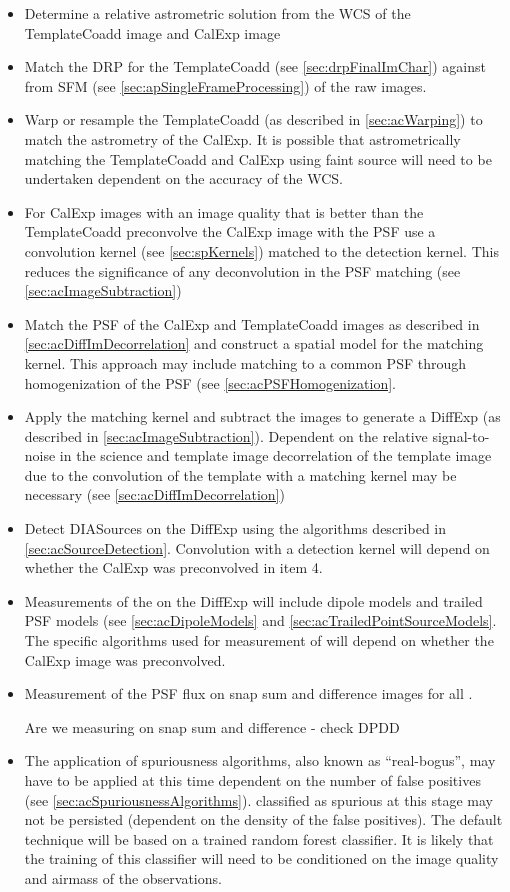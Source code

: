 \begin{itemize}
\item Determine a relative astrometric solution from the WCS of the TemplateCoadd image and CalExp image
\item Match the DRP \Sources for the TemplateCoadd (see \ref{sec:drpFinalImChar}) against \Sources from SFM (see \ref{sec:apSingleFrameProcessing}) of the raw images.
\item Warp or resample the TemplateCoadd (as described in \ref{sec:acWarping}) to match the astrometry of the CalExp. It is possible that astrometrically matching the TemplateCoadd and CalExp using faint source will need to be undertaken dependent on the accuracy of the WCS.
\item For CalExp images with an image quality that is better than the TemplateCoadd preconvolve the CalExp image with the PSF use a  convolution kernel (see \ref{sec:spKernels}) matched to the detection kernel. This reduces the significance of any deconvolution in the PSF matching (see \ref{sec:acImageSubtraction})
\item Match the PSF of the CalExp and TemplateCoadd images as described in \ref{sec:acDiffImDecorrelation} and construct a spatial model for the matching kernel. This approach may include matching to a common PSF through homogenization of the PSF (see \ref{sec:acPSFHomogenization}.
\item Apply the matching kernel and subtract the images to generate a DiffExp (as described in \ref{sec:acImageSubtraction}). Dependent on the relative signal-to-noise in the science and template image decorrelation of the template image due to the convolution of the template with a matching kernel may be necessary (see \ref{sec:acDiffImDecorrelation})
\item Detect DIASources on the DiffExp using the algorithms described in \ref{sec:acSourceDetection}. Convolution with a detection kernel will depend on whether the CalExp was preconvolved in item 4. 
\item Measurements of the \DIASources on the DiffExp will include dipole models and trailed PSF models (see  \ref{sec:acDipoleModels} and \ref{sec:acTrailedPointSourceModels}. The specific algorithms used for measurement of \DIASources will depend on whether the CalExp image was preconvolved.  
\item Measurement of the PSF flux on snap sum and difference images for all \DIASources.
\begin{note} Are we measuring on snap sum and difference - check DPDD\end{note}
\item The application of spuriousness algorithms, also known as ``real-bogus'', may have to be applied at this time dependent on the number of false positives (see \ref{sec:acSpuriousnessAlgorithms}). \DIASources classified as spurious at this stage may not be persisted (dependent on the density of the false positives). The default technique will be based on a trained random forest classifier. It is likely that the training of this classifier will need to be conditioned on the image quality and airmass of the observations.
\end{itemize}

